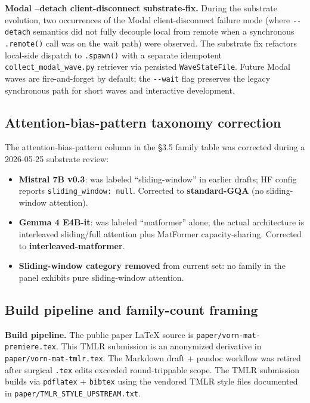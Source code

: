 \documentclass[10pt]{article}
\providecommand{\tightlist}{%
 \setlength{\itemsep}{0pt}\setlength{\parskip}{0pt}}
\begin{document}
\textbf{Modal --detach client-disconnect substrate-fix.} During the
substrate evolution, two occurrences of the Modal client-disconnect
failure mode (where \texttt{-\/-detach} semantics did not fully decouple
local from remote when a synchronous \texttt{.remote()} call was on the
wait path) were observed. The substrate fix refactors local-side
dispatch to \texttt{.spawn()} with a separate idempotent
\texttt{collect\_modal\_wave.py} retriever via persisted
\texttt{WaveStateFile}. Future Modal waves are fire-and-forget by
default; the \texttt{-\/-wait} flag preserves the legacy synchronous
path for short waves and interactive development.

\subsection{Attention-bias-pattern taxonomy correction}\label{c-5-attention-bias-pattern-taxonomy-correction}

The attention-bias-pattern column in the \S3.5 family table was
corrected during a 2026-05-25 substrate review:

\begin{itemize}
\tightlist
\item
 \textbf{Mistral 7B v0.3}: was labeled ``sliding-window'' in earlier
 drafts; HF config reports \texttt{sliding\_window:\ null}. Corrected
 to \textbf{standard-GQA} (no sliding-window attention).
\item
 \textbf{Gemma 4 E4B-it}: was labeled ``matformer'' alone; the actual
 architecture is interleaved sliding/full attention plus MatFormer
 capacity-sharing. Corrected to \textbf{interleaved-matformer}.
\item
 \textbf{Sliding-window category removed} from current set: no family
 in the panel exhibits pure sliding-window attention.
\end{itemize}

\subsection{Build pipeline and family-count framing}\label{c-6-build-pipeline-and-family-count-framing}

\textbf{Build pipeline.} The public paper LaTeX source is
\texttt{paper/vorn-mat-premiere.tex}. This TMLR submission is an
anonymized derivative in \texttt{paper/vorn-mat-tmlr.tex}. The Markdown
draft + pandoc workflow was retired after surgical \texttt{.tex} edits
exceeded round-trippable scope. The TMLR submission builds via
\texttt{pdflatex} + \texttt{bibtex} using the vendored TMLR style files
documented in \texttt{paper/TMLR\_STYLE\_UPSTREAM.txt}.
\end{document}
